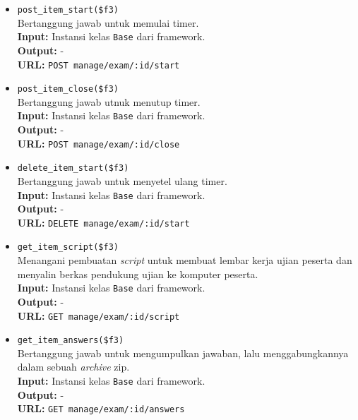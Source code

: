 \begin{itemize}
\begin{itemize}
                \item \texttt{post\_item\_start(\$f3)} \\
                    Bertanggung jawab untuk memulai timer.\\
                    \textbf{Input:} Instansi kelas \texttt{Base} dari
                    framework.\\
                    \textbf{Output:} -\\
                    \textbf{URL:} \texttt{POST manage/exam/:id/start}
                
                \item \texttt{post\_item\_close(\$f3)} \\
                    Bertanggung jawab utnuk menutup timer.\\
                    \textbf{Input:} Instansi kelas \texttt{Base} dari
                    framework.\\
                    \textbf{Output:} -\\
                    \textbf{URL:} \texttt{POST manage/exam/:id/close}
                
                \item \texttt{delete\_item\_start(\$f3)} \\
                    Bertanggung jawab untuk menyetel ulang timer.\\
                    \textbf{Input:} Instansi kelas \texttt{Base} dari
                    framework.\\
                    \textbf{Output:} -\\
                    \textbf{URL:} \texttt{DELETE manage/exam/:id/start}
                
                \item \texttt{get\_item\_script(\$f3)} \\
                    Menangani pembuatan \textit{script} untuk membuat lembar
                    kerja ujian peserta dan menyalin berkas pendukung ujian ke
                    komputer peserta.\\
                    \textbf{Input:} Instansi kelas \texttt{Base} dari
                    framework.\\
                    \textbf{Output:} -\\
                    \textbf{URL:} \texttt{GET manage/exam/:id/script}
                    
                \item \texttt{get\_item\_answers(\$f3)} \\
                    Bertanggung jawab untuk mengumpulkan jawaban, lalu
                    menggabungkannya dalam sebuah \textit{archive} zip.\\
                    \textbf{Input:} Instansi kelas \texttt{Base} dari
                    framework.\\
                    \textbf{Output:} -\\
                    \textbf{URL:} \texttt{GET manage/exam/:id/answers}
                

\end{itemize}
\end{itemize}
